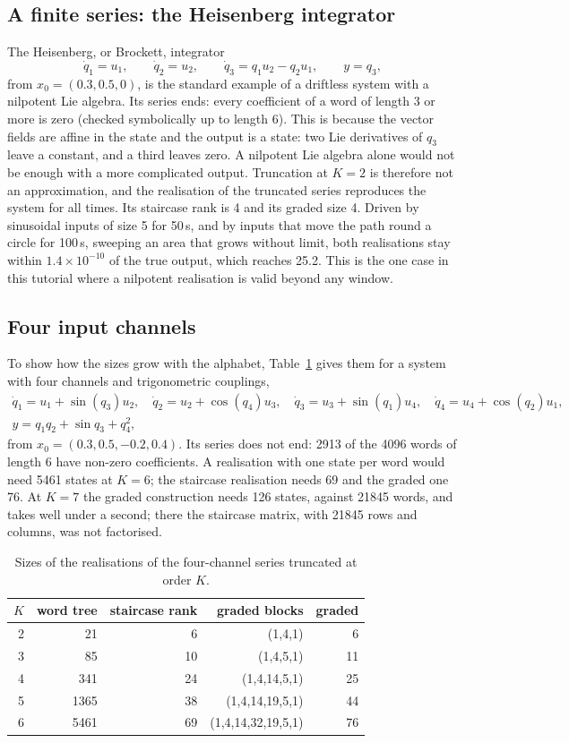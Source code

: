 \documentclass[11pt,a4paper]{article}
\theoremstyle{remark}
\begin{document}
\subsection{A finite series: the Heisenberg integrator}\label{sec:heisenberg}
The Heisenberg, or Brockett, integrator
\[\dot q_1=u_1,\qquad \dot q_2=u_2,\qquad \dot q_3=q_1u_2-q_2u_1,\qquad y=q_3,\]
from $x_0=(0.3,0.5,0)$, is the standard example of a driftless system with a nilpotent Lie algebra.
Its series ends: every coefficient of a word of length 3 or more is zero (checked symbolically up to length 6).
This is because the vector fields are affine in the state and the output is a state: two Lie derivatives of $q_3$ leave a constant, and a third leaves zero. A nilpotent Lie algebra alone would not be enough with a more complicated output.
Truncation at $K=2$ is therefore not an approximation, and the realisation of the truncated series reproduces the system for all times.
Its staircase rank is 4 and its graded size 4.
Driven by sinusoidal inputs of size 5 for 50\,s, and by inputs that move the path round a circle for 100\,s, sweeping an area that grows without limit, both realisations stay within $1.4\times10^{-10}$ of the true output, which reaches 25.2.
This is the one case in this tutorial where a nilpotent realisation is valid beyond any window.

\subsection{Four input channels}\label{sec:four}
To show how the sizes grow with the alphabet, Table~\ref{tab:four} gives them for a system with four channels and trigonometric couplings,
\begin{gather*}
\dot q_1=u_1+\sin(q_3)u_2,\quad \dot q_2=u_2+\cos(q_4)u_3,\quad \dot q_3=u_3+\sin(q_1)u_4,\quad \dot q_4=u_4+\cos(q_2)u_1,\\
y=q_1q_2+\sin q_3+q_4^2,
\end{gather*}
from $x_0=(0.3,0.5,-0.2,0.4)$.
Its series does not end: 2913 of the 4096 words of length 6 have non-zero coefficients.
A realisation with one state per word would need 5461 states at $K=6$; the staircase realisation needs 69 and the graded one 76.
At $K=7$ the graded construction needs 126 states, against 21845 words, and takes well under a second; there the staircase matrix, with 21845 rows and columns, was not factorised.

\begin{table}[t]\centering\small
\caption{Sizes of the realisations of the four-channel series truncated at order $K$.}\label{tab:four}
\begin{tabular}{rrrrr}\toprule
$K$ & word tree & staircase rank & graded blocks & graded\\\midrule
2 & 21 & 6 & (1,4,1) & 6\\
3 & 85 & 10 & (1,4,5,1) & 11\\
4 & 341 & 24 & (1,4,14,5,1) & 25\\
5 & 1365 & 38 & (1,4,14,19,5,1) & 44\\
6 & 5461 & 69 & (1,4,14,32,19,5,1) & 76\\
\bottomrule\end{tabular}
\end{table}
\end{document}
